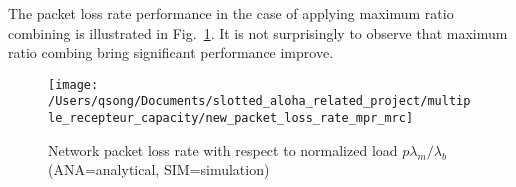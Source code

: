 The packet loss rate performance in the case of applying maximum ratio combining is illustrated in Fig.~\ref{fig:newpacketlossratemprmrc}. It is not surprisingly to observe that maximum ratio combing bring significant performance improve.
\begin{figure}
	\centering
	\texttt{[image: /Users/qsong/Documents/slotted\_aloha\_related\_project/multiple\_recepteur\_capacity/new\_packet\_loss\_rate\_mpr\_mrc]}
	\caption{Network packet loss rate with respect to normalized load $p\lambda_{m}/\lambda_{b}$ (ANA=analytical, SIM=simulation)}
	\label{fig:newpacketlossratemprmrc}
\end{figure}
